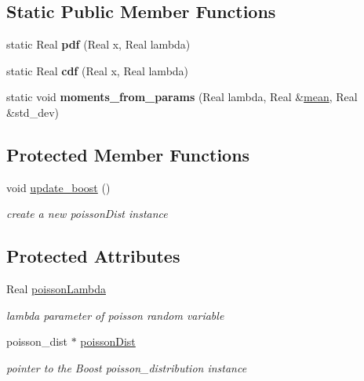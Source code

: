\subsection*{Static Public Member Functions}
\begin{DoxyCompactItemize}
\item 
static Real {\bfseries pdf} (Real x, Real lambda)\label{classPecos_1_1PoissonRandomVariable_adee39cbdb22afe093299b384acab095d}

\item 
static Real {\bfseries cdf} (Real x, Real lambda)\label{classPecos_1_1PoissonRandomVariable_a5807e7fc5da0fe6add1b91dc4d4f9065}

\item 
static void {\bfseries moments\+\_\+from\+\_\+params} (Real lambda, Real \&\hyperlink{classPecos_1_1PoissonRandomVariable_a962ffe5a3593be370d5c883365c060f4}{mean}, Real \&std\+\_\+dev)\label{classPecos_1_1PoissonRandomVariable_a03518f14a2713b226c803f15ef5fcc7c}

\end{DoxyCompactItemize}
\subsection*{Protected Member Functions}
\begin{DoxyCompactItemize}
\item 
void \hyperlink{classPecos_1_1PoissonRandomVariable_aaa6750cbee2245416a6eeeac58d4405a}{update\+\_\+boost} ()\label{classPecos_1_1PoissonRandomVariable_aaa6750cbee2245416a6eeeac58d4405a}

\begin{DoxyCompactList}\small\item\em create a new poisson\+Dist instance \end{DoxyCompactList}\end{DoxyCompactItemize}
\subsection*{Protected Attributes}
\begin{DoxyCompactItemize}
\item 
Real \hyperlink{classPecos_1_1PoissonRandomVariable_a7303276db7a73f20264aa74c6e08ed61}{poisson\+Lambda}\label{classPecos_1_1PoissonRandomVariable_a7303276db7a73f20264aa74c6e08ed61}

\begin{DoxyCompactList}\small\item\em lambda parameter of poisson random variable \end{DoxyCompactList}\item 
poisson\+\_\+dist $\ast$ \hyperlink{classPecos_1_1PoissonRandomVariable_a4303b1114bc6c4f2abb14172ddbe64dd}{poisson\+Dist}\label{classPecos_1_1PoissonRandomVariable_a4303b1114bc6c4f2abb14172ddbe64dd}

\begin{DoxyCompactList}\small\item\em pointer to the Boost poisson\+\_\+distribution instance \end{DoxyCompactList}\end{DoxyCompactItemize}


